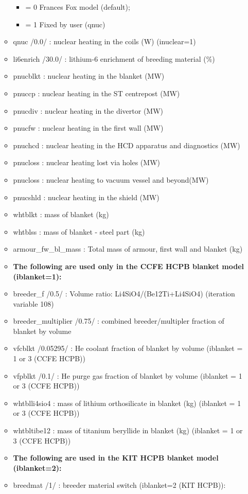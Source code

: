 \documentclass[
]{article}
\providecommand{\tightlist}{%
  \setlength{\itemsep}{0pt}\setlength{\parskip}{0pt}}
\begin{document}
\begin{itemize}
\begin{itemize}
    \begin{itemize}
    \tightlist
    \item
      = 0 Frances Fox model (default);
    \item
      = 1 Fixed by user (qnuc)
    \end{itemize}
  \item
    qnuc /0.0/ : nuclear heating in the coils (W) (inuclear=1)
  \item
    li6enrich /30.0/ : lithium-6 enrichment of breeding material (\%)
  \item
    pnucblkt : nuclear heating in the blanket (MW)
  \item
    pnuccp : nuclear heating in the ST centrepost (MW)
  \item
    pnucdiv : nuclear heating in the divertor (MW)
  \item
    pnucfw : nuclear heating in the first wall (MW)
  \item
    pnuchcd : nuclear heating in the HCD apparatus and diagnostics (MW)
  \item
    pnucloss : nuclear heating lost via holes (MW)
  \item
    pnucloss : nuclear heating to vacuum vessel and beyond(MW)
  \item
    pnucshld : nuclear heating in the shield (MW)
  \item
    whtblkt : mass of blanket (kg)
  \item
    whtblss : mass of blanket - steel part (kg)
  \item
    armour\_fw\_bl\_mass : Total mass of armour, first wall and blanket
    (kg)
  \item
    \textbf{The following are used only in the CCFE HCPB blanket model
    (iblanket=1):}
  \item
    breeder\_f /0.5/ : Volume ratio: Li4SiO4/(Be12Ti+Li4SiO4) (iteration
    variable 108)
  \item
    breeder\_multiplier /0.75/ : combined breeder/multipler fraction of
    blanket by volume
  \item
    vfcblkt /0.05295/ : He coolant fraction of blanket by volume
    (iblanket = 1 or 3 (CCFE HCPB))
  \item
    vfpblkt /0.1/ : He purge gas fraction of blanket by volume (iblanket
    = 1 or 3 (CCFE HCPB))
  \item
    whtblli4sio4 : mass of lithium orthosilicate in blanket (kg)
    (iblanket = 1 or 3 (CCFE HCPB))
  \item
    whtbltibe12 : mass of titanium beryllide in blanket (kg) (iblanket =
    1 or 3 (CCFE HCPB))
  \item
    \textbf{The following are used in the KIT HCPB blanket model
    (iblanket=2):}
  \item
    breedmat /1/ : breeder material switch (iblanket=2 (KIT HCPB)):


\end{itemize}
\end{itemize}
\end{document}
